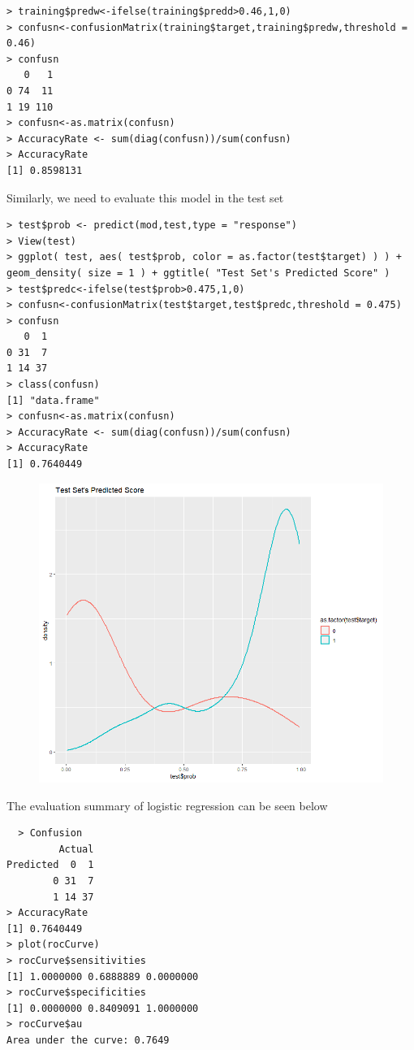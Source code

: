 \documentclass{article}
\begin{document}
\begin{lstlisting}
> training$predw<-ifelse(training$predd>0.46,1,0)
> confusn<-confusionMatrix(training$target,training$predw,threshold = 0.46)
> confusn
   0   1
0 74  11
1 19 110
> confusn<-as.matrix(confusn)
> AccuracyRate <- sum(diag(confusn))/sum(confusn)
> AccuracyRate
[1] 0.8598131
\end{lstlisting}
Similarly, we need to evaluate this model in the test set
\begin{lstlisting}
> test$prob <- predict(mod,test,type = "response")
> View(test)
> ggplot( test, aes( test$prob, color = as.factor(test$target) ) ) + geom_density( size = 1 ) + ggtitle( "Test Set's Predicted Score" )
> test$predc<-ifelse(test$prob>0.475,1,0)
> confusn<-confusionMatrix(test$target,test$predc,threshold = 0.475)
> confusn
   0  1
0 31  7
1 14 37
> class(confusn)
[1] "data.frame"
> confusn<-as.matrix(confusn)
> AccuracyRate <- sum(diag(confusn))/sum(confusn)
> AccuracyRate
[1] 0.7640449
\end{lstlisting}
\begin{figure}[H]
  \centering
  \includegraphics[width=1\textwidth]{1_1_testScore.png}
\end{figure}
The evaluation summary of logistic regression can be seen below
\begin{lstlisting}
  > Confusion
         Actual
Predicted  0  1
        0 31  7
        1 14 37
> AccuracyRate
[1] 0.7640449
> plot(rocCurve)
> rocCurve$sensitivities
[1] 1.0000000 0.6888889 0.0000000
> rocCurve$specificities
[1] 0.0000000 0.8409091 1.0000000
> rocCurve$au
Area under the curve: 0.7649
\end{lstlisting}
\end{document}
